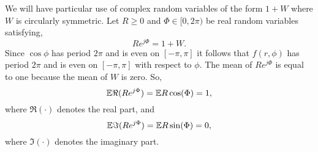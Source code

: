 \documentclass[journal]{IEEEtran}
\begin{document}
We will have particular use of complex random variables of the form $1 + W$ where $W$ is circularly symmetric.  Let $R \geq 0$ and $\Phi \in [0,2\pi)$ be real random variables satisfying, 
\[
R e^{j\Phi} = 1 + W.
\]
Since $\cos\phi$ has period $2\pi$ and is even on $[-\pi,\pi]$ it follows that $f(r,\phi)$ has period $2\pi$ and is even on $[-\pi,\pi]$ with respect to $\phi$.  The mean of $R e^{j\Phi}$ is equal to one because the mean of $W$ is zero.  So,
\[
{\mathbb E} \Re(R e^{j\Phi}) = {\mathbb E} R \cos(\Phi) = 1,
\]
where $\Re(\cdot)$ denotes the real part, and
\begin{equation}\label{eq:expectImpartRphi}
{\mathbb E} \Im(R e^{j\Phi}) = {\mathbb E} R \sin(\Phi) = 0,
\end{equation}
where $\Im(\cdot)$ denotes the imaginary part.


\end{document}

